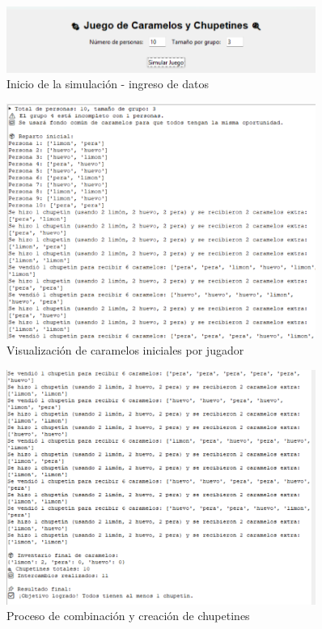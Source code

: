 \documentclass[12pt,spanish]{article}
\begin{document}
\begin{figure}[h!]
  \centering
  \includegraphics[width=0.9\textwidth]{cara1.png}
  \caption{Inicio de la simulación - ingreso de datos}
\end{figure}

\begin{figure}[h!]
  \centering
  \includegraphics[width=0.9\textwidth]{cara2.png}
  \caption{Visualización de caramelos iniciales por jugador}
\end{figure}

\begin{figure}[h!]
  \centering
  \includegraphics[width=0.9\textwidth]{cara3.png}
  \caption{Proceso de combinación y creación de chupetines}
\end{figure}
\end{document}
